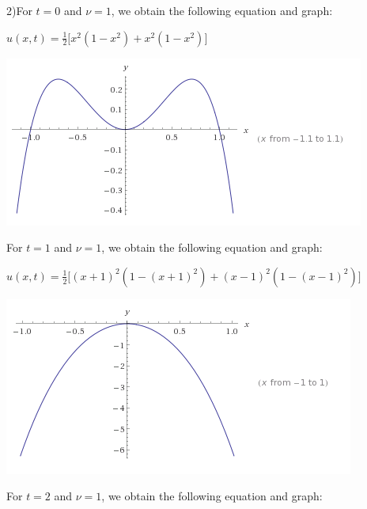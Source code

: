 \documentclass[executivepaper]{article}
\begin{document}
\vspace{3mm}

\begin{flushleft}

2)For $t=0$ and $\nu=1$, we obtain the following equation and graph:

\vspace{3mm}

$u(x,t)=\frac{1}{2} \bigg[x^2(1-x^2)+x^2(1-x^2)\bigg]$

\vspace{3mm}

\includegraphics[scale=0.5]{TEqualToZeroAndVEqualToOne}

\vspace{3mm}

For $t=1$ and $\nu=1$, we obtain the following equation and graph:

\vspace{3mm}

$u(x,t)=\frac{1}{2} \bigg[(x+1)^2(1-(x+1)^2)+(x-1)^2(1-(x-1)^2)\bigg]$

\vspace{3mm}

\includegraphics[scale=0.5]{TAndVEqual1}

\vspace{3mm}

For $t=2$ and $\nu=1$, we obtain the following equation and graph:


\end{flushleft}
\end{document}
